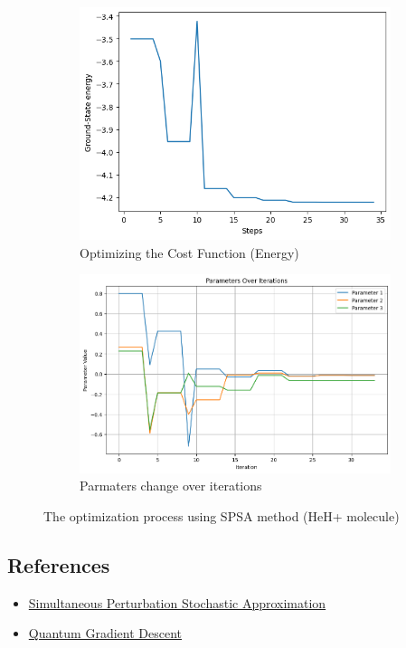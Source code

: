 \documentclass{article}
\begin{document}
    \begin{figure}[H]
        \centering
        \begin{subfigure}[b]{0.45\textwidth}
            \centering
            \includegraphics[width=\textwidth]{Pasted image 1.png}
            \caption{Optimizing the Cost Function (Energy)}
        \end{subfigure}
        \hfill
        \begin{subfigure}[b]{0.45\textwidth}
            \centering
            \includegraphics[width=\textwidth]{Pasted image.png}
            \caption{Parmaters change over iterations}
        \end{subfigure}
        \caption{The optimization process using SPSA method (HeH+ molecule)}
    
    
    \end{figure}
\subsection*{References}
\begin{itemize}
    \item \href{https://www.jhuapl.edu/SPSA/PDF-SPSA/Spall_An_Overview.PDF}{Simultaneous Perturbation Stochastic Approximation}
    \item \href{https://physlab.org/wp-content/uploads/2023/05/Quantum_Gradient_Descent_24100266_Fin.pdf#:~:text=The%20parameter%20shift%20rule%20is%20a%20crucial%20technique,parameter%20%CE%B8i%20can%20be%20computed%20as%3A%20%E2%88%82%E2%9F%A8O%E2%9F%A9%201}{Quantum Gradient Descent}
\end{itemize}
\end{document}
